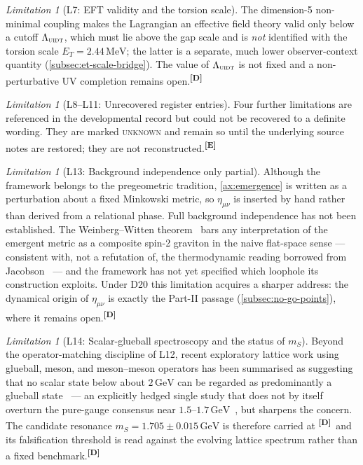 \documentclass[12pt,a4paper,twoside]{article}
\theoremstyle{plain}
\theoremstyle{definition}
\theoremstyle{remark}
\newtheorem{limitation}[theorem]{Limitation}
\newcommand{\UIDT}{\textsc{uidt}}
\newcommand{\GeV}{\,\mathrm{GeV}}
\newcommand{\MeV}{\,\mathrm{MeV}}
\newcommand{\catmark}[1]{\textsuperscript{\textsf{\textbf{[#1]}}}}
\newcommand{\ETorsion}{2.44\MeV} %
\begin{document}
\begin{limitation}[L7: EFT validity and the torsion scale]
\label{lim:L7}
The dimension-5 non-minimal coupling makes the Lagrangian an effective
field theory valid only below a cutoff $\Lambda_{\UIDT}$, which must lie
above the gap scale and is \emph{not} identified with the torsion scale
$E_T = \ETorsion$; the latter is a separate, much lower observer-context
quantity (\cref{subsec:et-scale-bridge}). The value of $\Lambda_{\UIDT}$
is not fixed and a non-perturbative UV completion remains
open.\catmark{D}
\end{limitation}

\begin{limitation}[L8--L11: Unrecovered register entries]
\label{lim:L8toL11}
Four further limitations are referenced in the developmental record but
could not be recovered to a definite wording. They are marked
\textsc{unknown} and remain so until the underlying source notes are
restored; they are not reconstructed.\catmark{E}
\end{limitation}

\begin{limitation}[L13: Background independence only partial]
\label{lim:L13}
Although the framework belongs to the pregeometric tradition,
\cref{ax:emergence} is written as a perturbation about a fixed Minkowski
metric, so $\eta_{\mu\nu}$ is inserted by hand rather than derived from
a relational phase. Full background independence has not been
established. The Weinberg--Witten theorem~\cite{weinbergwitten1980} bars any interpretation of the
emergent metric as a composite spin-2 graviton in the naive flat-space
sense --- consistent with, not a refutation of, the thermodynamic
reading borrowed from Jacobson~\cite{jenkins2009,carlip2014} --- and the framework has not yet
specified which loophole its construction exploits. Under D20 this
limitation acquires a sharper address: the dynamical origin of
$\eta_{\mu\nu}$ is exactly the Part-II passage
(\cref{subsec:no-go-points}), where it remains open.\catmark{D}
\end{limitation}

\begin{limitation}[L14: Scalar-glueball spectroscopy and the status of $m_S$]
\label{lim:L14}
Beyond the operator-matching discipline of L12, recent exploratory
lattice work using glueball, meson, and meson--meson operators has been
summarised as suggesting that no scalar state below about
$2\,\mathrm{GeV}$ can be regarded as predominantly a glueball state~\cite{morningstar2024} ---
an explicitly hedged single study that does not by itself overturn the
pure-gauge consensus near $1.5$--$1.7\,\mathrm{GeV}$~\cite{athenodorou2020,morningstar1999}, but sharpens the
concern. The candidate resonance $m_S = 1.705 \pm 0.015\GeV$ is
therefore carried at \catmark{D}\ and its falsification threshold is
read against the evolving lattice spectrum rather than a fixed
benchmark.\catmark{D}
\end{limitation}
\end{document}
